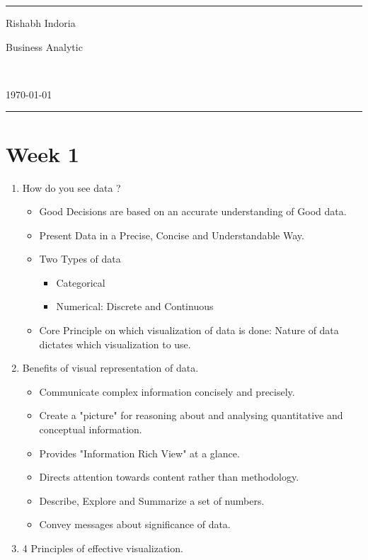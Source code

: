 \documentclass[a4paper]{article}
\begin{document}
\fancyhead[c]{}
\hrule \medskip
\begin{minipage}{0.295\textwidth}
\raggedright
Rishabh Indoria
\end{minipage}
\begin{minipage}{0.4\textwidth}
\centering
\LARGE
Business Analytic
\end{minipage}\
\begin{minipage}{0.295\textwidth}
\raggedleft
\today \hfill \\
\end{minipage}
\medskip \hrule
\bigskip

\section{Week 1}
	\begin{enumerate}
		\item How do you see data ?
		\begin{itemize}
			\item Good Decisions are based on an accurate understanding of Good data.
			\item Present Data in a Precise, Concise and Understandable Way.
			\item Two Types of data
			\begin{itemize}
				\item Categorical
				\item Numerical: Discrete and Continuous
			\end{itemize}
		\item Core Principle on which visualization of data is done: Nature of data dictates which visualization to use.
		\end{itemize}
		\item Benefits of visual representation of data.
		\begin{itemize}
			\item Communicate complex information concisely and precisely.
			\item Create a "picture" for reasoning about and analysing quantitative and conceptual information.
			\item Provides "Information Rich View" at a glance.
			\item Directs attention towards content rather than methodology.
			\item Describe, Explore and Summarize a set of numbers.
			\item Convey messages about significance of data.
		\end{itemize}
		\item 4 Principles of effective visualization.

\end{enumerate}
\end{document}

